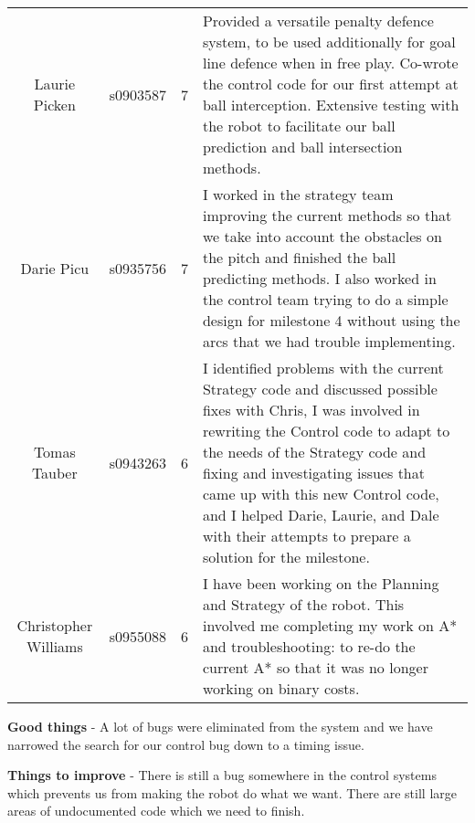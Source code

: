 \documentclass[10pt, a4paper]{article} %
\begin{document}
\begin{longtable}{c c c p{16cm}}
    Laurie Picken &
    s0903587 &
    7&
    Provided a versatile penalty defence system, to be used additionally for
    goal line defence when in free play. Co-wrote the control code for our
    first attempt at ball interception. Extensive testing with the robot to
    facilitate our ball prediction and ball intersection methods.\\

    Darie Picu &
    s0935756 &
    7&
    I worked in the strategy team improving the current methods so that we take
    into account the obstacles on the pitch and finished the ball predicting
    methods. I also worked in the control team trying to do a simple design for
    milestone 4 without using the arcs that we had trouble implementing.\\

    Tomas Tauber &
    s0943263 &
    6&
    I identified problems with the current Strategy code and discussed possible
    fixes with Chris, I was involved in rewriting the Control code to adapt to the
    needs of the Strategy code and fixing and investigating issues that came up
    with this new Control code, and I helped Darie, Laurie, and Dale with their
    attempts to prepare a solution for the milestone.\\

    Christopher Williams &
    s0955088 &
    6&
    I have been working on the Planning and Strategy of the robot. This
    involved me completing my work on A* and troubleshooting: to re-do the
    current A* so that it was no longer working on binary costs.\\



\end{longtable}
\textbf{Good things} - A lot of bugs were eliminated from the system and we
have narrowed the search for our control bug down to a timing issue.

\textbf{Things to improve} - There is still a bug somewhere in the control
systems which prevents us from making the robot do what we want. There are
still large areas of undocumented code which we need to finish.
\end{document}

